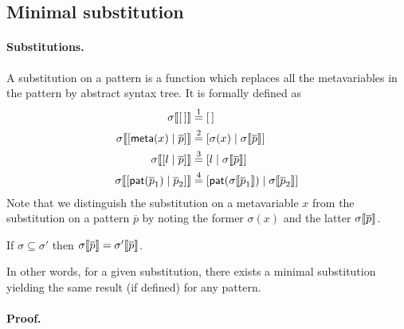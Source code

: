 
\subsection{Minimal substitution}

\paragraph{Substitutions.}

A substitution on a pattern is a function which replaces all the
meta\-variables in the pattern by abstract syntax tree. It is
formally defined as
\begin{align*}
  \subst{\el}{\sigma} 
&\eqn{1} \el\\
  \subst{\cons{\cstr{meta}{x}}{\overline{p}}}{\sigma}
&\eqn{2} \cons{\sigma(x)}{\subst{\overline{p}}{\sigma}}\\
  \subst{\cons{l}{\overline{p}}}{\sigma}
&\eqn{3} \cons{l}{\subst{\overline{p}}{\sigma}}\\
  \subst{\cons{\pat{\overline{p}_1}}{\overline{p}_2}}{\sigma}
&\eqn{4}
  \cons{\pat{\subst{\overline{p}_1}{\sigma}}}%
       {\subst{\overline{p}_2}{\sigma}}
\end{align*}
Note that we distinguish the substitution on a meta\-variable
\(x\) from the substitution on a pattern \(\overline{p}\) by noting
the former \(\sigma(x)\) and the latter
\(\subst{\overline{p}}{\sigma}\).

\begin{lemma}[Minimality]\hfill
\label{minimality}
\begin{center}
If \(\sigma \subseteq \sigma'\) 
then \(\subst{\overline{p}}{\sigma} = \subst{\overline{p}}{\sigma'}\).
\end{center}
\end{lemma}
\noindent In other words, for a given substitution, there exists a
minimal substitution yielding the same result (if defined) for any
pattern.

\paragraph{Proof.}

